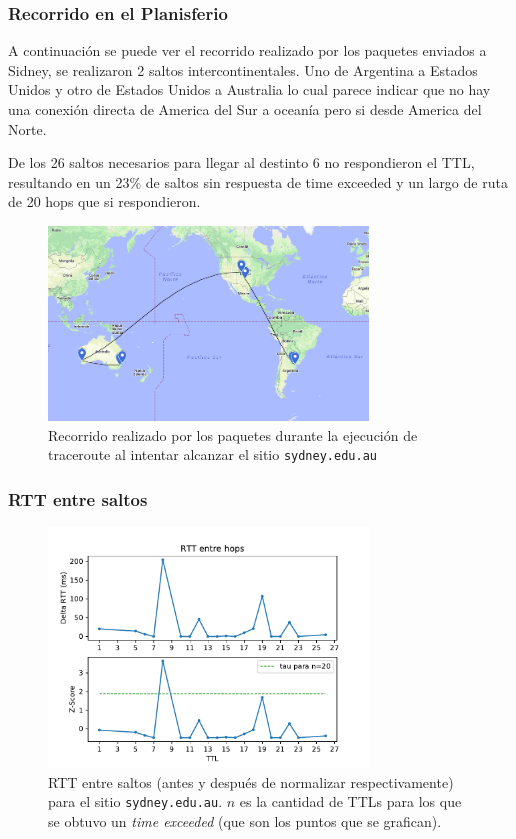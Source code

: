 \subsubsection*{Recorrido en el Planisferio}


A continuación se puede ver el recorrido realizado por los paquetes enviados a Sidney, se realizaron 2 saltos intercontinentales. Uno de Argentina a Estados Unidos y otro de Estados Unidos a Australia lo cual parece indicar que no hay una conexión directa de America del Sur a oceanía pero si desde America del Norte.

De los 26 saltos necesarios para llegar al destinto 6 no respondieron el TTL, resultando en un 23\% de saltos sin respuesta de time exceeded y un largo de ruta de 20 hops que si respondieron.

\begin{figure}[H]
  \centering
  \includegraphics[width=8.5cm]{figs/sidney.png}
  \caption{\footnotesize Recorrido realizado por los paquetes durante la ejecución de traceroute al intentar alcanzar el sitio \texttt{sydney.edu.au}}
\end{figure}

\subsubsection*{RTT entre saltos}

\begin{figure}[H]
  \centering
  \includegraphics[width=8.5cm]{figs/traceroute-sidney.pdf}
  \caption{\footnotesize RTT entre saltos (antes y después de normalizar respectivamente) para el sitio \texttt{sydney.edu.au}. $n$ es la cantidad de TTLs para los que se obtuvo un \emph{time exceeded} (que son los puntos que se grafican).}
\end{figure}

